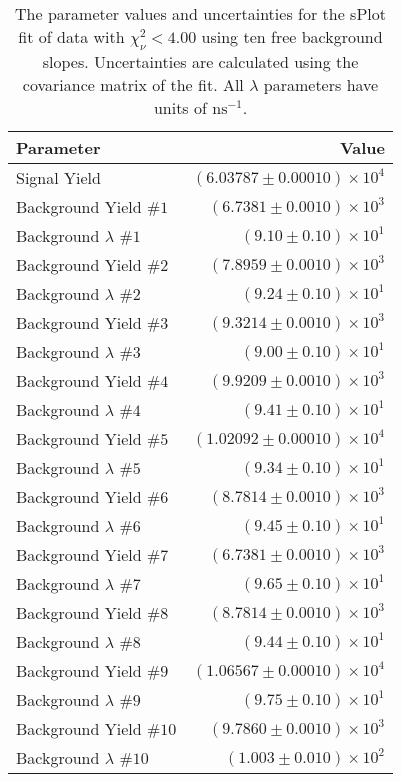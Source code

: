 
\begin{table}[ht]
    \begin{center}
        \begin{tabular}{lr}\toprule
            Parameter & Value \\\midrule
            Signal Yield & $(6.03787 \pm 0.00010) \times 10^{4}$ \\
            Background Yield $\#1$ & $(6.7381 \pm 0.0010) \times 10^{3}$ \\
            Background $\lambda$ $\#1$ & $(9.10 \pm 0.10) \times 10^{1}$ \\
            Background Yield $\#2$ & $(7.8959 \pm 0.0010) \times 10^{3}$ \\
            Background $\lambda$ $\#2$ & $(9.24 \pm 0.10) \times 10^{1}$ \\
            Background Yield $\#3$ & $(9.3214 \pm 0.0010) \times 10^{3}$ \\
            Background $\lambda$ $\#3$ & $(9.00 \pm 0.10) \times 10^{1}$ \\
            Background Yield $\#4$ & $(9.9209 \pm 0.0010) \times 10^{3}$ \\
            Background $\lambda$ $\#4$ & $(9.41 \pm 0.10) \times 10^{1}$ \\
            Background Yield $\#5$ & $(1.02092 \pm 0.00010) \times 10^{4}$ \\
            Background $\lambda$ $\#5$ & $(9.34 \pm 0.10) \times 10^{1}$ \\
            Background Yield $\#6$ & $(8.7814 \pm 0.0010) \times 10^{3}$ \\
            Background $\lambda$ $\#6$ & $(9.45 \pm 0.10) \times 10^{1}$ \\
            Background Yield $\#7$ & $(6.7381 \pm 0.0010) \times 10^{3}$ \\
            Background $\lambda$ $\#7$ & $(9.65 \pm 0.10) \times 10^{1}$ \\
            Background Yield $\#8$ & $(8.7814 \pm 0.0010) \times 10^{3}$ \\
            Background $\lambda$ $\#8$ & $(9.44 \pm 0.10) \times 10^{1}$ \\
            Background Yield $\#9$ & $(1.06567 \pm 0.00010) \times 10^{4}$ \\
            Background $\lambda$ $\#9$ & $(9.75 \pm 0.10) \times 10^{1}$ \\
            Background Yield $\#10$ & $(9.7860 \pm 0.0010) \times 10^{3}$ \\
            Background $\lambda$ $\#10$ & $(1.003 \pm 0.010) \times 10^{2}$ \\\bottomrule
        \end{tabular}
        \caption{The parameter values and uncertainties for the sPlot fit of data with $\chi^2_\nu < 4.00$ using ten free background slopes. Uncertainties are calculated using the covariance matrix of the fit. All $\lambda$ parameters have units of $\si{\nano\second}^{-1}$.}\label{tab:splot-fit-results-chisqdof-4.00-free-10}
    \end{center}
\end{table}
